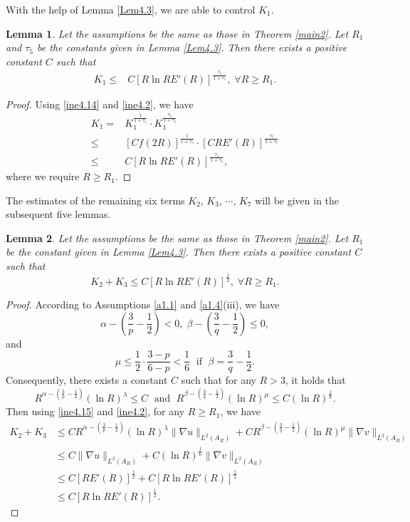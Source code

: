 \documentclass[11pt,reqno]{amsart}
\newtheorem{Lem}{Lemma}[section]
\numberwithin{Thm}{section}
\begin{document}
With the help of Lemma \ref{Lem4.3}, we are able to control $K_1$.

\begin{Lem}\label{Lem4.4}
Let the assumptions be the same as those in  {\rm Theorem \ref{main2}}. Let $R_1$ and $\tau_5$ be the constants given in {\rm Lemma \ref{Lem4.3}}. Then there exists a positive constant $C$ such that
	\begin{align}\label{ine4.16}
	K_1\leq&C\left[R\ln R E'(R)\right]^\frac{\tau_5}{1+\tau_5},\;\forall R\geq R_1.
	\end{align}
\end{Lem}
\begin{proof}
	Using \eqref{ine4.14} and \eqref{ine4.2}, we have
	\begin{align*}
		K_1=&K_1^\frac{1}{1+\tau_5}\cdot K_1^\frac{\tau_5}{1+\tau_5} \\
        \leq&\left[Cf(2R)\right]^\frac{1}{1+\tau_5}\cdot\left[CR E'(R)\right]^\frac{\tau_5}{1+\tau_5}\\
		\leq&C\left[R\ln R E'(R)\right]^\frac{\tau_5}{1+\tau_5},
	\end{align*}
	where we require $R\geq R_1$.
	\end{proof}

The estimates of the remaining six terms $K_2$, $K_3$, $\cdots$, $K_7$ will be given in the subsequent five lemmas.

\begin{Lem}\label{Lem4.5}
Let the assumptions be the same as those in  {\rm Theorem \ref{main2}}.  Let $R_1$  be the constant given in {\rm Lemma \ref{Lem4.3}}. Then there exists a positive constant $C$ such that
\begin{equation}\label{ine4.17}
K_2+K_3\leq C[R\ln R E'(R)]^\frac{1}{2},\;\forall R\geq R_1.
\end{equation}
\end{Lem}
\begin{proof}
According to Assumptions \ref{a1.1} and \ref{a1.4}(iii), we have
$$
\alpha-\left(\frac{3}{p}-\frac{1}{2}\right)<0,\;\beta-\left(\frac{3}{q}-\frac{1}{2}\right)\leq0,
$$
and
$$
\mu\leq\frac{1}{2}\cdot\frac{3-p}{6-p}<\frac{1}{6}\;\text{ if }\;\beta=\frac{3}{q}-\frac{1}{2}.
$$
Consequently, there exists a constant $C$ such that for any $R>3$, it holds that
$$
R^{\alpha-\left(\frac{3}{p}-\frac{1}{2}\right)}(\ln R)^\lambda\leq C\;\text{ and }\;R^{\beta-\left(\frac{3}{q}-\frac{1}{2}\right)}(\ln R)^\mu\leq C(\ln R)^\frac{1}{6}.
$$
Then using \eqref{ine4.15} and \eqref{ine4.2}, for any $R\geq R_1$, we have
\begin{align*}
K_2+K_3&\leq  CR^{\alpha-\left(\frac{3}{p}-\frac{1}{2}\right)}(\ln R)^\lambda \|\nabla u\|_{L^2(A_R)}+ CR^{\beta-\left(\frac{3}{q}-\frac{1}{2}\right)}(\ln R)^\mu\|\nabla v\|_{L^2(A_R)}\\
&\leq C\|\nabla u\|_{L^2(A_R)}+C(\ln R)^\frac{1}{6}\|\nabla v\|_{L^2(A_R)}\\
&\leq C[R E'(R)]^\frac{1}{2}+C[R\ln R E'(R)]^\frac{1}{2}\\
&\leq C[R\ln R E'(R)]^\frac{1}{2}.
\end{align*}
\end{proof}
\end{document}
